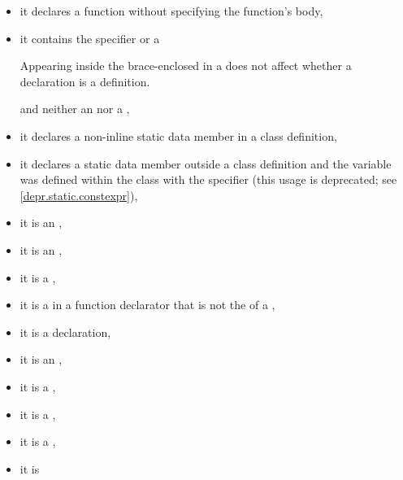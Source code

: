 \begin{itemize}
\item
it declares a function
without specifying the function's body,
\item
it contains
the
%
 specifier or a
\begin{footnote}
Appearing inside the brace-enclosed
 in a  does
not affect whether a declaration is a definition.
\end{footnote}
and neither an  nor a
,
\item
{}%
it declares a non-inline static data member in a class
definition,
\item
it declares a static data member outside a class definition
and the variable was defined within the class with the 
specifier (this usage is deprecated; see \ref{depr.static.constexpr}),
\item
{}%
it is an ,
\item
it is an
%
,
\item
it is a
%
,
\item
it is a
%
 in a function
%
declarator that is not the  of a
,
\item
it is a
%
 declaration,
\item it is
an ,
\item it is
a ,
\item it is
a ,
\item it is
a ,
\item it is

\end{itemize}
